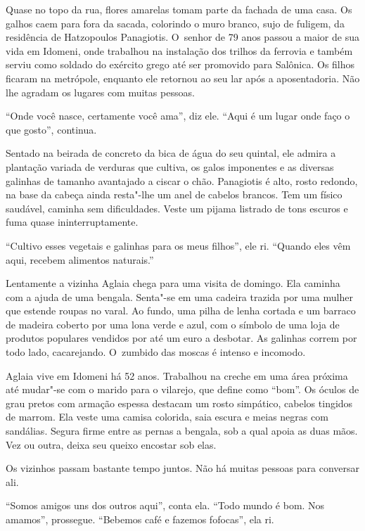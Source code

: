 Quase no topo da rua, flores amarelas tomam parte da fachada de uma
casa. Os galhos caem para fora da sacada, colorindo o muro branco, sujo
de fuligem, da residência de Hatzopoulos Panagiotis. O~senhor de 79 anos
passou a maior de sua vida em Idomeni, onde trabalhou na instalação dos
trilhos da ferrovia e também serviu como soldado do exército grego até
ser promovido para Salônica. Os filhos ficaram na metrópole, enquanto
ele retornou ao seu lar após a aposentadoria. Não lhe agradam os lugares
com muitas pessoas.

``Onde você nasce, certamente você ama'', diz ele. ``Aqui é um lugar
onde faço o que gosto'', continua.

Sentado na beirada de concreto da bica de água do seu quintal, ele
admira a plantação variada de verduras que cultiva, os galos imponentes
e as diversas galinhas de tamanho avantajado a ciscar o chão. Panagiotis
é alto, rosto redondo, na base da cabeça ainda resta"-lhe um anel de
cabelos brancos. Tem um físico saudável, caminha sem dificuldades. Veste
um pijama listrado de tons escuros e fuma quase ininterruptamente.

``Cultivo esses vegetais e galinhas para os meus filhos'', ele ri.
``Quando eles vêm aqui, recebem alimentos naturais.''

Lentamente a vizinha Aglaia chega para uma visita de domingo. Ela
caminha com a ajuda de uma bengala. Senta"-se em uma cadeira trazida por
uma mulher que estende roupas no varal. Ao fundo, uma pilha de lenha
cortada e um barraco de madeira coberto por uma lona verde e azul, com o
símbolo de uma loja de produtos populares vendidos por até um euro a
desbotar. As galinhas correm por todo lado, cacarejando. O~zumbido das
moscas é intenso e incomodo.

Aglaia vive em Idomeni há 52 anos. Trabalhou na creche em uma área
próxima até mudar"-se com o marido para o vilarejo, que define como
``bom''. Os óculos de grau pretos com armação espessa destacam um rosto
simpático, cabelos tingidos de marrom. Ela veste uma camisa colorida,
saia escura e meias negras com sandálias. Segura firme entre as pernas a
bengala, sob a qual apoia as duas mãos. Vez ou outra, deixa seu queixo
encostar sob elas.

Os vizinhos passam bastante tempo juntos. Não há muitas pessoas para
conversar ali.

``Somos amigos uns dos outros aqui'', conta ela. ``Todo mundo é bom. Nos
amamos'', prossegue. ``Bebemos café e fazemos fofocas'', ela ri.


